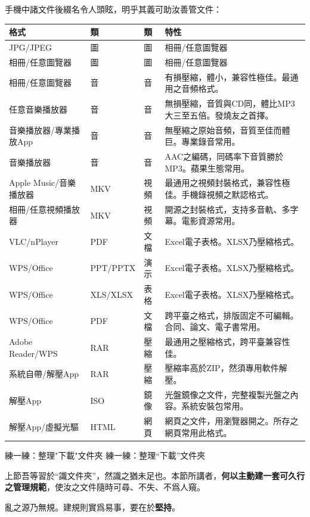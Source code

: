 
手機中諸文件後綴名令人頭眩，明乎其義可助汝善管文件：

\begin{center}
\begin{tabularx}{\linewidth}{|X|X|X|X|}
\hline
\textbf{格式} & \textbf{類} & \textbf{類} & \textbf{特性} \tabularnewline
\hline
JPG/JPEG & 圖 & 圖 & 相冊/任意圖覽器 \tabularnewline
相冊/任意圖覽器 & 圖 & 圖 & 相冊/任意圖覽器 \tabularnewline
相冊/任意圖覽器 & 音 & 音 & 有損壓縮，體小，兼容性極佳。最通用之音頻格式。 \tabularnewline
任意音樂播放器 & 音 & 音 & 無損壓縮，音質與CD同，體比MP3大三至五倍。發燒友之首擇。 \tabularnewline
音樂播放器/專業播放App & 音 & 音 & 無壓縮之原始音頻，音質至佳而體巨。專業錄音常用。 \tabularnewline
音樂播放器 & 音 & 音 & AAC之編碼，同碼率下音質勝於MP3。蘋果生態常用。 \tabularnewline
Apple Music/音樂播放器 & MKV & 視頻 & 最通用之視頻封裝格式，兼容性極佳。手機錄視頻之默認格式。 \tabularnewline
相冊/任意視頻播放器 & MKV & 視頻 & 開源之封裝格式，支持多音軌、多字幕。電影資源常用。 \tabularnewline
VLC/nPlayer & PDF & 文檔 & Excel電子表格。XLSX乃壓縮格式。 \tabularnewline
WPS/Office & PPT/PPTX & 演示 & Excel電子表格。XLSX乃壓縮格式。 \tabularnewline
WPS/Office & XLS/XLSX & 表格 & Excel電子表格。XLSX乃壓縮格式。 \tabularnewline
WPS/Office & PDF & 文檔 & 跨平臺之格式，排版固定不可編輯。合同、論文、電子書常用。 \tabularnewline
Adobe Reader/WPS & RAR & 壓縮 & 最通用之壓縮格式，跨平臺兼容性佳。 \tabularnewline
系統自帶/解壓App & RAR & 壓縮 & 壓縮率高於ZIP，然須專用軟件解壓。 \tabularnewline
解壓App & ISO & 鏡像 & 光盤鏡像之文件，完整複製光盤之內容。系統安裝包常用。 \tabularnewline
解壓App/虛擬光驅 & HTML & 網頁 & 網頁之文件，用瀏覽器開之。所存之網頁常用此格式。 \tabularnewline
\hline
\end{tabularx}
\end{center}

\begin{tcbpractice}{練一練：整理"下載"文件夾}
練一練：整理“下載”文件夾

\end{tcbpractice}


上節吾等習於“識文件夾”，然識之猶未足也。本節所講者，\textbf{何以主動建一套可久行之管理規範}，使汝之文件隨時可尋、不失、不爲人窺。


亂之源乃無規。建規則實爲易事，要在於\textbf{堅持}。


